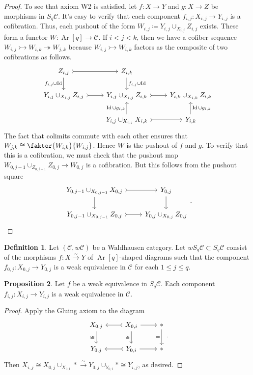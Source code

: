 \documentclass[10pt,letterpaper,cm]{nupset}
\theoremstyle{definition}
\newtheorem{definition}{Definition}
\theoremstyle{theorem}
\newtheorem{prop}[definition]{Proposition}
\theoremstyle{remark}
\newcommand{\1}{\mathbf{1}}
\renewcommand{\c}{\mathscr{C}}
\newcommand{\0}{\vec 0}
\DeclareMathOperator{\id}{Id}
\DeclareMathOperator{\Ar}{Ar}
\begin{document}
\begin{proof}
To see that axiom W2 is satisfied, let $f: X \to Y$ and $g : X \to Z$ be morphisms in $S_q \c$. It's easy to verify that each component $f_{i, j}: X_{i, j} \to Y_{i, j}$ is a cofibration. Thus, each pushout of the form $W_{i, j} \coloneqq Y_{i,j} \cup_{X_{i,j}} Z_{i, j}$ exists.
These form a functor $W: \Ar\left[q\right] \to \c$. If $i < j < k$, then we have a cofiber sequence $W_{i,j} \rightarrowtail W_{i, k} \twoheadrightarrow W_{j,k}$ because  $W_{i,j} \rightarrowtail W_{i, k}$ factors as the composite of two cofibrations as follows.
\[
\begin{tikzcd}
{Z_{i,j}} \arrow[d, "{f_{i,j} \cup \id}"'] \arrow[r, tail] & {Z_{i,k}} \arrow[d, "{f_{i,j} \cup \id}"] &  \\
{Y_{i,j} \cup_{X_{i,j}} Z_{i,j}} \arrow[r, tail] & {Y_{i,j} \cup_{X_{i,j}} Z_{i,k}} \arrow[r, tail] & {Y_{i,k} \cup_{X_{i,k}} Z_{i,k}} \\
 & {Y_{i,j} \cup_{X_{i,j}} X_{i,k}} \arrow[u, "{\id \cup g_{i,k}}"] \arrow[r, tail] & {Y_{i,k}} \arrow[u, "{\id \cup g_{i,k}}"']
\end{tikzcd}
\] The fact that colimits commute with each other ensures that $W_{j,k} \cong \faktor{W_{i,k}}{W_{i,j}}$. Hence $W$ is the pushout of $f$ and $g$. To verify that this is a cofibration, we must check that the pushout map $W_{0, j-1} \cup_{Z_{0, j-1}} Z_{0, j} \to W_{0, j}$ is a cofibration. But this follows from the pushout square
\[
\begin{tikzcd}
{Y_{0, j-1}\cup_{X_{0, j-1}} X_{0, j}} \arrow[d] \arrow[r, tail] & {Y_{0, j}} \arrow[d] \\
{Y_{0, j-1}\cup_{X_{0, j-1}} Z_{0, j}} \arrow[r, tail] & {Y_{0, j}\cup_{X_{0, j}} Z_{0, j}}
\end{tikzcd}
.\]
\end{proof}

\begin{definition}
Let $\left(\c, w{\c}\right)$ be a Waldhausen category. Let $w S_q\c \subset S_q \c$ consist of the morphisms $f: X \overset{\sim}{\longrightarrow} Y$ of $\Ar\left[q\right]$-shaped diagrams such that the component $f_{0, j} : X_{0, j} \to Y_{0, j}$ is a weak equivalence in $\c$ for each $1\leq j \leq q$.
\end{definition}

\begin{prop}
Let $f$ be a weak equivalence in $S_q \c$.  Each component $f_{i, j}: X_{i, j} \to Y_{i, j}$ is a weak equivalence in $\c$.
\end{prop}
\begin{proof}
Apply the Gluing axiom to the diagram
\[
\begin{tikzcd}
{X_{0, j}} \arrow[d, "\cong"'] & {X_{0, i}} \arrow[l, tail] \arrow[r] \arrow[d, "\cong"'] & \ast \arrow[d, "="'] \\
{Y_{0, j}} & {Y_{0, i}} \arrow[l, tail] \arrow[r] & \ast
\end{tikzcd}.
\] Then $X_{i, j} \cong X_{0, j} \cup_{X_{0, i}} \ast \overset{\sim}{\longrightarrow} Y_{0, j} \cup_{Y_{0, i}} \ast \cong Y_{i, j}$, as desired.
\end{proof}
\end{document}
